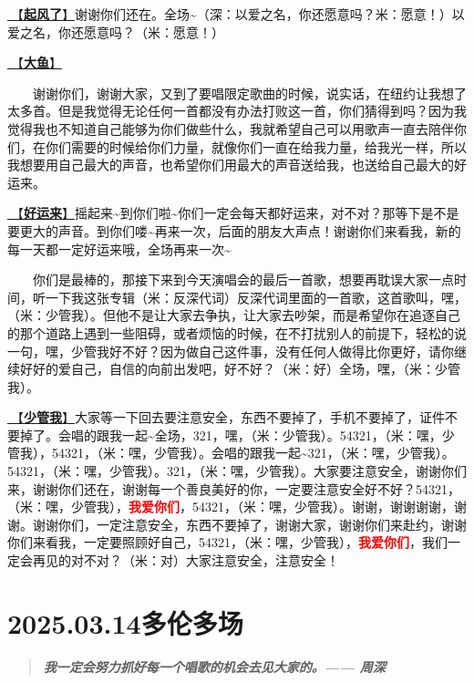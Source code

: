\documentclass[]{ctexbook}
\begin{document}
\hyperref[the-wind-rises]{🎵【\textbf{起风了}】}谢谢你们还在。全场\textasciitilde（深：以爱之名，你还愿意吗？米：愿意！）以爱之名，你还愿意吗？（米：愿意！）

\hyperref[big-fish]{🎵【\textbf{大鱼}】}

  谢谢你们，谢谢大家，又到了要唱限定歌曲的时候，说实话，在纽约让我想了太多首。但是我觉得无论任何一首都没有办法打败这一首，你们猜得到吗？因为我觉得我也不知道自己能够为你们做些什么，我就希望自己可以用歌声一直去陪伴你们，在你们需要的时候给你们力量，就像你们一直在给我力量，给我光一样，所以我想要用自己最大的声音，也希望你们用最大的声音送给我，也送给自己最大的好运来。

\hyperref[good-luck-comes]{🎵【\textbf{好运来}】}摇起来\textasciitilde 到你们啦\textasciitilde 你们一定会每天都好运来，对不对？那等下是不是要更大的声音。到你们喽\textasciitilde 再来一次，后面的朋友大声点！谢谢你们来看我，新的每一天都一定好运来哦，全场再来一次\textasciitilde{}

  你们是最棒的，那接下来到今天演唱会的最后一首歌，想要再耽误大家一点时间，听一下我这张专辑（米：反深代词）反深代词里面的一首歌，这首歌叫，嘿，（米：少管我）。但他不是让大家去争执，让大家去吵架，而是希望你在追逐自己的那个道路上遇到一些阻碍，或者烦恼的时候，在不打扰别人的前提下，轻松的说一句，嘿，少管我好不好？因为做自己这件事，没有任何人做得比你更好，请你继续好好的爱自己，自信的向前出发吧，好不好？（米：好）全场，嘿，（米：少管我）。

\hyperref[watch-ur-manners]{🎵【\textbf{少管我}】}大家等一下回去要注意安全，东西不要掉了，手机不要掉了，证件不要掉了。会唱的跟我一起\textasciitilde 全场，321，嘿，（米：少管我）。54321，（米：嘿，少管我），54321，（米：嘿，少管我）。会唱的跟我一起\textasciitilde321，（米：嘿，少管我）。54321，（米：嘿，少管我）。321，（米：嘿，少管我）。大家要注意安全，谢谢你们来，谢谢你们还在，谢谢每一个善良美好的你，一定要注意安全好不好？54321，（米：嘿，少管我），\textbf{\textcolor{red}{我爱你们}}，54321，（米：嘿，少管我）。谢谢，谢谢谢谢，谢谢。谢谢你们，一定注意安全，东西不要掉了，谢谢大家，谢谢你们来赴约，谢谢你们来看我，一定要照顾好自己，54321，（米：嘿，少管我），\textbf{\textcolor{red}{我爱你们}}，我们一定会再见的对不对？（米：对）大家注意安全，注意安全！

\chapter{2025.03.14多伦多场}\label{Toronto-20250314}

\begin{quote}
\textbf{\emph{我一定会努力抓好每一个唱歌的机会去见大家的。------ 周深}}
\end{quote}
\end{document}
